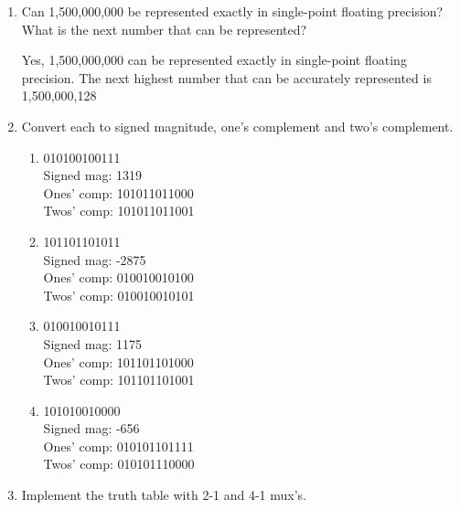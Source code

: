 \documentclass[12pt,letterpaper]{article}
\begin{document}
\begin{enumerate}
    \item
      Can 1,500,000,000 be represented exactly in single-point floating precision?
      What is the next number that can be represented?

      Yes, 1,500,000,000 can be represented exactly in single-point floating precision.
      The next highest number that can be accurately represented is 1,500,000,128

    \item
      Convert each to signed magnitude, one's complement and two's complement.

      \begin{enumerate}
        \item 010100100111 \\
          Signed mag: 1319 \\
          Ones' comp: 101011011000 \\
          Twos' comp: 101011011001

        \item 101101101011 \\
          Signed mag: -2875 \\
          Ones' comp: 010010010100 \\
          Twos' comp: 010010010101

        \item 010010010111 \\
          Signed mag: 1175 \\
          Ones' comp: 101101101000 \\
          Twos' comp: 101101101001

        \item 101010010000 \\
          Signed mag: -656 \\
          Ones' comp: 010101101111 \\
          Twos' comp: 010101110000

      \end{enumerate}
    \item
      Implement the truth table with 2-1 and 4-1 mux's.

  \end{enumerate}
\end{document}
